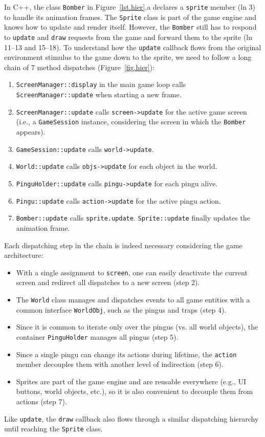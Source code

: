 \documentclass[10pt, conference, compsocconf]{IEEEtran}
\newcommand{\code}[1] {{\small{\texttt{#1}}}}
\begin{document}
In C++, the class \code{Bomber} in Figure~\ref{lst.hier}.a declares a
\code{sprite} member (ln 3) to handle its animation frames.
%
The \code{Sprite} class is part of the game engine and knows how to update and
render itself.
However, the \code{Bomber} still has to respond to \code{update} and
\code{draw} requests from the game and forward them to the sprite
(ln 11--13 and 15--18).
%
To understand how the \code{update} callback flows from the original
environment stimulus to the game down to the sprite, we need to follow a long
chain of 7 method dispatches (Figure~\ref{fig.hier}):
%
\begin{enumerate}
\item \code{ScreenManager::display} in the main game loop calls\\
      \code{ScreenManager::update} when starting a new frame.
\item \code{ScreenManager::update} calls \code{screen->update} for the active
      game screen (i.e., a \code{GameSession} instance, considering the screen
      in which the \code{Bomber} appears).
\item \code{GameSession::update} calls \code{world->update}.
\item \code{World::update} calls \code{objs->update} for each object in the
      world.
\item \code{PinguHolder::update} calls \code{pingu->update} for each pingu
      alive.
\item \code{Pingu::update} calls \code{action->update} for the active pingu
      action.
\item \code{Bomber::update} calls \code{sprite.update}.
      \code{Sprite::update} finally updates the animation frame.
\end{enumerate}
%
Each dispatching step in the chain is indeed necessary considering the game
architecture:
%
\begin{itemize}
\item With a single assignment to \code{screen}, one can easily deactivate the
current screen and redirect all dispatches to a new screen (step 2).
\item The \code{World} class manages and dispatches events to all game
      entities with a common interface \code{WorldObj}, such as the pingus and
      traps (step 4).
\item Since it is common to iterate only over the pingus (vs. all world
      objects), the container \code{PinguHolder} manages all pingus (step 5).
\item Since a single pingu can change its actions during lifetime, the
      \code{action} member decouples them with another level of indirection
      (step 6).
\item Sprites are part of the game engine and are reusable everywhere (e.g., UI
      buttons, world objects, etc.), so it is also convenient to decouple them
      from actions (step 7).
\end{itemize}
%
Like \code{update}, the \code{draw} callback also flows through a similar
dispatching hierarchy until reaching the \code{Sprite} class.
\end{document}
